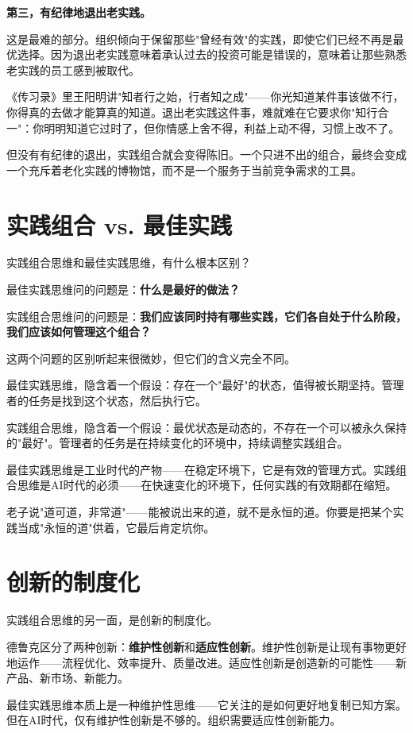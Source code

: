 \textbf{第三，有纪律地退出老实践。}

这是最难的部分。组织倾向于保留那些"曾经有效"的实践，即使它们已经不再是最优选择。因为退出老实践意味着承认过去的投资可能是错误的，意味着让那些熟悉老实践的员工感到被取代。

《传习录》里王阳明讲"知者行之始，行者知之成"——你光知道某件事该做不行，你得真的去做才能算真的知道。退出老实践这件事，难就难在它要求你"知行合一"：你明明知道它过时了，但你情感上舍不得，利益上动不得，习惯上改不了。

但没有有纪律的退出，实践组合就会变得陈旧。一个只进不出的组合，最终会变成一个充斥着老化实践的博物馆，而不是一个服务于当前竞争需求的工具。

\section{实践组合 vs. 最佳实践}


实践组合思维和最佳实践思维，有什么根本区别？

最佳实践思维问的问题是：\textbf{什么是最好的做法？}

实践组合思维问的问题是：\textbf{我们应该同时持有哪些实践，它们各自处于什么阶段，我们应该如何管理这个组合？}

这两个问题的区别听起来很微妙，但它们的含义完全不同。

最佳实践思维，隐含着一个假设：存在一个"最好"的状态，值得被长期坚持。管理者的任务是找到这个状态，然后执行它。

实践组合思维，隐含着一个假设：最优状态是动态的，不存在一个可以被永久保持的"最好"。管理者的任务是在持续变化的环境中，持续调整实践组合。

最佳实践思维是工业时代的产物——在稳定环境下，它是有效的管理方式。实践组合思维是AI时代的必须——在快速变化的环境下，任何实践的有效期都在缩短。

老子说"道可道，非常道"——能被说出来的道，就不是永恒的道。你要是把某个实践当成"永恒的道"供着，它最后肯定坑你。

\section{创新的制度化}


实践组合思维的另一面，是创新的制度化。

德鲁克区分了两种创新：\textbf{维护性创新}和\textbf{适应性创新}。维护性创新是让现有事物更好地运作——流程优化、效率提升、质量改进。适应性创新是创造新的可能性——新产品、新市场、新能力。

最佳实践思维本质上是一种维护性思维——它关注的是如何更好地复制已知方案。但在AI时代，仅有维护性创新是不够的。组织需要适应性创新能力。

